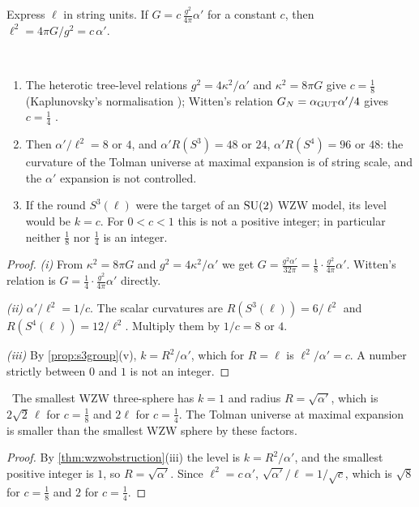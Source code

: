 Express $\ell$ in string units. If $G=c\,\frac{g^2}{4\pi}\alpha'$ for a constant $c$, then $\ell^2=4\pi G/g^2=c\,\alpha'$.

\begin{theorem}\label{thm:wzwobstruction}\ver\nogo\
\begin{enumerate}[label=(\roman*)]
\item The heterotic tree-level relations $g^2=4\kappa^2/\alpha'$ and $\kappa^2=8\pi G$ give $c=\frac18$ (Kaplunovsky's normalisation \cite{Kaplunovsky1988}); Witten's relation $G_N=\alpha_{\rm GUT}\alpha'/4$ gives $c=\frac14$ \cite{Witten1996}.
\item Then $\alpha'/\ell^2=8$ or $4$, and $\alpha'R(S^3)=48$ or $24$, $\alpha'R(S^4)=96$ or $48$: the curvature of the Tolman universe at maximal expansion is of string scale, and the $\alpha'$ expansion is not controlled.
\item If the round $S^3(\ell)$ were the target of an $\mathrm{SU}(2)$ WZW model, its level would be $k=c$. For $0<c<1$ this is not a positive integer; in particular neither $\frac18$ nor $\frac14$ is an integer.
\end{enumerate}
\end{theorem}
\begin{proof}
\emph{(i)} From $\kappa^2=8\pi G$ and $g^2=4\kappa^2/\alpha'$ we get $G=\frac{g^2\alpha'}{32\pi}=\frac18\cdot\frac{g^2}{4\pi}\alpha'$. Witten's relation is $G=\frac14\cdot\frac{g^2}{4\pi}\alpha'$ directly.

\emph{(ii)} $\alpha'/\ell^2=1/c$. The scalar curvatures are $R(S^3(\ell))=6/\ell^2$ and $R(S^4(\ell))=12/\ell^2$. Multiply them by $1/c=8$ or $4$.

\emph{(iii)} By \cref{prop:s3group}(v), $k=R^2/\alpha'$, which for $R=\ell$ is $\ell^2/\alpha'=c$. A number strictly between $0$ and $1$ is not an integer.
\end{proof}


\begin{corollary}[Smallest WZW sphere]\txt\
The smallest WZW three-sphere has $k=1$ and radius $R=\sqrt{\alpha'}$, which is $2\sqrt2\,\ell$ for $c=\frac18$ and $2\ell$ for $c=\frac14$. The Tolman universe at maximal expansion is smaller than the smallest WZW sphere by these factors.
\end{corollary}
\begin{proof}
By \cref{thm:wzwobstruction}(iii) the level is $k=R^2/\alpha'$, and the smallest positive integer is $1$, so $R=\sqrt{\alpha'}$. Since $\ell^2=c\,\alpha'$, $\sqrt{\alpha'}/\ell=1/\sqrt c$, which is $\sqrt8$ for $c=\frac18$ and $2$ for $c=\frac14$.
\end{proof}

